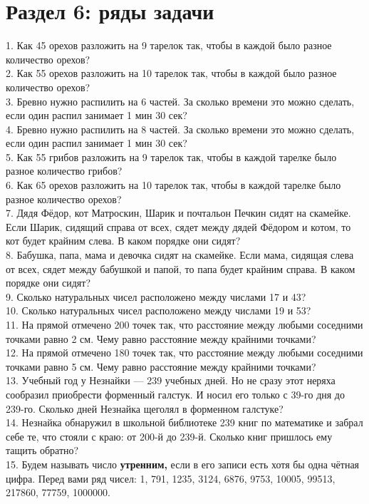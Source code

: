 \section{Раздел 6: ряды задачи}
1. Как 45 орехов разложить на 9 тарелок так, чтобы в каждой было разное количество орехов?\\
2. Как 55 орехов разложить на 10 тарелок так, чтобы в каждой было разное количество орехов?\\
3. Бревно нужно распилить на 6 частей. За сколько времени это можно сделать, если один распил занимает 1 мин 30 сек?\\
4. Бревно нужно распилить на 8 частей. За сколько времени это можно сделать, если один распил занимает 1 мин 30 сек?\\
5. Как 55 грибов разложить на 9 тарелок так, чтобы в каждой тарелке было разное количество грибов?\\
6. Как 65 орехов разложить на 10 тарелок так, чтобы в каждой тарелке было разное количество орехов?\\
7. Дядя Фёдор, кот Матроскин, Шарик и почтальон Печкин сидят на скамейке. Если Шарик, сидящий справа от всех, сядет между дядей Фёдором и котом, то кот будет крайним слева. В каком порядке они сидят?\\
8. Бабушка, папа, мама и девочка сидят на скамейке. Если мама, сидящая слева от всех, сядет между бабушкой и папой, то папа будет крайним справа. В каком порядке они сидят?\\
9. Сколько натуральных чисел расположено между числами 17 и 43?\\
10. Сколько натуральных чисел расположено между числами 19 и 53?\\
11. На прямой отмечено 200 точек так, что расстояние между любыми соседними точками равно 2 см. Чему равно расстояние между крайними точками?\\
12. На прямой отмечено 180 точек так, что расстояние между любыми соседними точками равно 5 см. Чему равно расстояние между крайними точками?\\
13. Учебный год у Незнайки --- 239 учебных дней. Но не сразу этот неряха сообразил приобрести форменный галстук. И носил его только с 39-го дня до 239-го. Сколько дней Незнайка щеголял в форменном галстуке?\\
14. Незнайка обнаружил в школьной библиотеке 239 книг по математике и забрал себе те, что стояли с краю: от 200-й до 239-й. Сколько книг пришлось ему тащить обратно?\\
15. Будем называть число {\bf утренним,} если в его записи есть хотя бы одна чётная цифра. Перед вами ряд чисел: 1, 791, 1235, 3124, 6876, 9753, 10005, 99513, 217860, 77759, 1000000.\\
